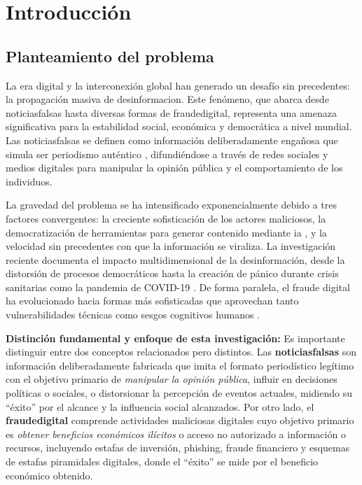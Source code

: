 \chapter{Introducción \label{cap:Introduccion}}

\section{Planteamiento del problema}

La era digital y la interconexión global han generado un desafío sin precedentes: la propagación masiva de \gls{desinformacion}. Este fenómeno, que abarca desde \gls{noticiasfalsas} hasta diversas formas de \gls{fraudedigital}, representa una amenaza significativa para la estabilidad social, económica y democrática a nivel mundial. Las \gls{noticiasfalsas} se definen como información deliberadamente engañosa que simula ser periodismo auténtico \cite{bondielli2019survey}, difundiéndose a través de redes sociales y medios digitales para manipular la opinión pública y el comportamiento de los individuos.

La gravedad del problema se ha intensificado exponencialmente debido a tres factores convergentes: la creciente sofisticación de los actores maliciosos, la democratización de herramientas para generar contenido mediante \gls{ia} \cite{hu2024bad}, y la velocidad sin precedentes con que la información se viraliza. La investigación reciente documenta el impacto multidimensional de la desinformación, desde la distorsión de procesos democráticos \cite{ali2020posttruth} hasta la creación de pánico durante crisis sanitarias como la pandemia de COVID-19 \cite{perez2020fake}. De forma paralela, el fraude digital ha evolucionado hacia formas más sofisticadas que aprovechan tanto vulnerabilidades técnicas como sesgos cognitivos humanos \cite{ali2021fake}.

\textbf{Distinción fundamental y enfoque de esta investigación:} Es importante distinguir entre dos conceptos relacionados pero distintos. Las \textbf{\gls{noticiasfalsas}} son información deliberadamente fabricada que imita el formato periodístico legítimo con el objetivo primario de \textit{manipular la opinión pública}, influir en decisiones políticas o sociales, o distorsionar la percepción de eventos actuales, midiendo su ``éxito'' por el alcance y la influencia social alcanzados. Por otro lado, el \textbf{\gls{fraudedigital}} comprende actividades maliciosas digitales cuyo objetivo primario es \textit{obtener beneficios económicos ilícitos} o acceso no autorizado a información o recursos, incluyendo estafas de inversión, phishing, fraude financiero y esquemas de estafas piramidales digitales, donde el ``éxito'' se mide por el beneficio económico obtenido.

